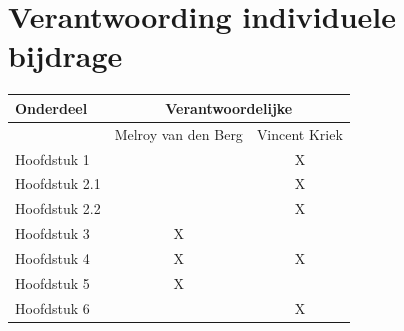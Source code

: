\documentclass[]{article}
\begin{document}
\newpage
\section{Verantwoording individuele bijdrage}

\begin{tabular}{|| l | c | c ||}\hline
    Onderdeel           &   \multicolumn{2}{|c||}{Verantwoordelijke} \\\hline
                        & Melroy van den Berg & Vincent Kriek        \\\hline\hline
    Hoofdstuk 1         &                     &  X                   \\\hline
    Hoofdstuk 2.1       &                     &  X                   \\\hline
    Hoofdstuk 2.2       &                     &  X                   \\\hline
    Hoofdstuk 3         &       X             &                      \\\hline
    Hoofdstuk 4         &       X             &  X                   \\\hline
    Hoofdstuk 5         &       X             &                      \\\hline
    Hoofdstuk 6         &                     &  X                   \\\hline
\end{tabular}
\end{document}
